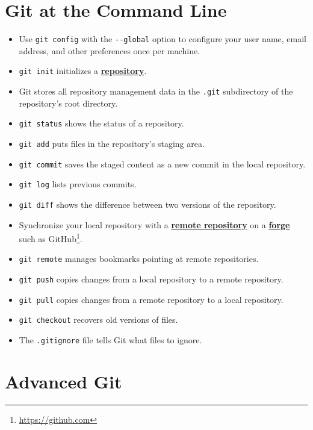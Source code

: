 \documentclass[
]{krantz}
\providecommand{\tightlist}{%
  \setlength{\itemsep}{0pt}\setlength{\parskip}{0pt}}
\renewcommand{\href}[2]{#2\footnote{\url{#1}}}
\newcommand{\gref}[2]{\hyperlink{#2}{\textbf{#1}}}
\begin{document}
\hypertarget{git-at-the-command-line-1}{%
\section{Git at the Command Line}\label{git-at-the-command-line-1}}

\begin{itemize}
\tightlist
\item
  Use \texttt{git\ config} with the \texttt{-\/-global} option to configure your user name,
  email address, and other preferences once per machine.
\item
  \texttt{git\ init} initializes a \gref{repository}{repository}.
\item
  Git stores all repository management data in the \texttt{.git} subdirectory of the repository's root directory.
\item
  \texttt{git\ status} shows the status of a repository.
\item
  \texttt{git\ add} puts files in the repository's staging area.
\item
  \texttt{git\ commit} saves the staged content as a new commit in the local repository.
\item
  \texttt{git\ log} lists previous commits.
\item
  \texttt{git\ diff} shows the difference between two versions of the repository.
\item
  Synchronize your local repository with a \gref{remote repository}{remote\_repository}
  on a \gref{forge}{forge} such as \href{https://github.com}{GitHub}.
\item
  \texttt{git\ remote} manages bookmarks pointing at remote repositories.
\item
  \texttt{git\ push} copies changes from a local repository to a remote repository.
\item
  \texttt{git\ pull} copies changes from a remote repository to a local repository.
\item
  \texttt{git\ checkout} recovers old versions of files.
\item
  The \texttt{.gitignore} file tells Git what files to ignore.
\end{itemize}

\hypertarget{advanced-git-1}{%
\section{Advanced Git}\label{advanced-git-1}}
\end{document}
